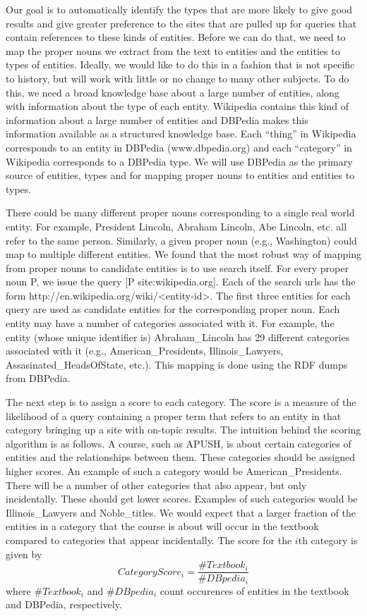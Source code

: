 \documentclass{acm_proc_article-sp}
\begin{document}
Our goal is to automatically identify the types that are more likely to give
good results and give greater preference to the sites that are pulled up for
queries that contain references to these kinds of entities. Before we can do
that, we need to map the proper nouns we extract from the text to entities and
the entities to types of entities. Ideally, we would like to do this in a
fashion that is not specific to history, but will work with little or no change
to many other subjects. To do this, we need a broad knowledge base about a large
number of entities, along with information about the type of each
entity. Wikipedia contains this kind of information about a large number of
entities and DBPedia makes this information available as a structured knowledge
base. Each ``thing'' in Wikipedia corresponds to an entity in DBPedia
(www.dbpedia.org) and each ``category'' in Wikipedia corresponds to a DBPedia
type. We will use DBPedia as the primary source of entities, types and for
mapping proper nouns to entities and entities to types. 

There could be many different proper nouns corresponding to a single real world
entity. For example, President Lincoln, Abraham Lincoln, Abe Lincoln, etc. all
refer to the same person. Similarly, a given proper noun (e.g., Washington) could
map to multiple different entities. We found that the most robust way of mapping
from proper nouns to candidate entities is to use search itself. For every
proper noun P, we issue the query [P site:wikipedia.org]. Each of the search
urls has the form http://en.wikipedia.org/wiki/<entity-id>. The first three entities
for each query are used as candidate entities for the corresponding proper
noun. Each entity may have a number of categories associated with it. For
example, the entity (whose unique identifier is) Abraham\_Lincoln has 29
different categories associated with it (e.g., American\_Presidents,
Illinois\_Lawyers, Assasinated\_HeadsOfState, etc.). This mapping is done using
the RDF dumps from DBPedia. 

The next step is to assign a score to each category. The score is a measure of
the likelihood of a query containing a proper term that refers to an entity in
that category bringing up a site with on-topic results. The intuition behind the
scoring algorithm is as follows. A course, such as APUSH, is about certain
categories of entities and the relationships between them. These categories
should be assigned higher scores. An example of such a category would be
American\_Presidents. There will be a number of other categories that also
appear, but only incidentally. These should get lower scores. Examples of such
categories would be Illinois\_Lawyers and Noble\_titles. We would expect that a
larger fraction of the entities in a category that the course is about will
occur in the textbook compared to categories that appear incidentally. The score
for the $i$th category is given by
\begin{equation}
CategoryScore_i = \frac{\#Textbook_i}{\#DBpedia_i}
\end{equation}
where $\#Textbook_i$ and $\#DBpedia_i$ count occurences of entities in the
textbook and DBPedia, respectively. 
\end{document}
